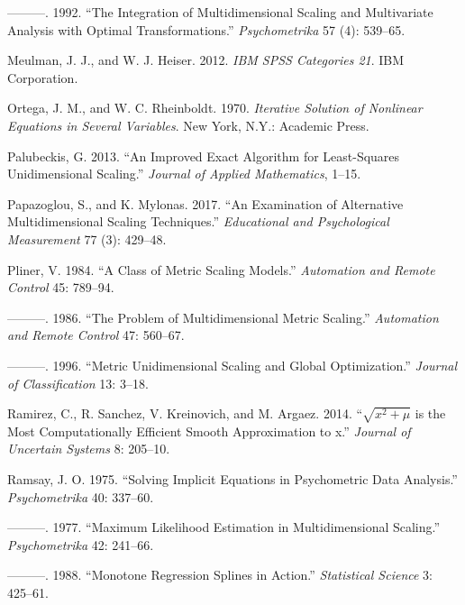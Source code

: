 \documentclass[
  12pt,
  letterpaper,
  DIV=11,
  numbers=noendperiod]{scrreprt}
\newlength{\cslhangindent}
\newenvironment{CSLReferences}[2] %
 {\begin{list}{}{%
  \setlength{\itemindent}{0pt}
  \setlength{\leftmargin}{0pt}
  \setlength{\parsep}{0pt}
  \ifodd #1
   \setlength{\leftmargin}{\cslhangindent}
   \setlength{\itemindent}{-1\cslhangindent}
  \fi
  \setlength{\itemsep}{#2\baselineskip}}}
 {\end{list}}
\theoremstyle{remark}
\begin{document}
\begin{CSLReferences}{1}{0}
---------. 1992. {``{The Integration of Multidimensional Scaling and
Multivariate Analysis with Optimal Transformations}.''}
\emph{Psychometrika} 57 (4): 539--65.

Meulman, J. J., and W. J. Heiser. 2012. \emph{IBM SPSS Categories 21}.
IBM Corporation.

Ortega, J. M., and W. C. Rheinboldt. 1970. \emph{{Iterative Solution of
Nonlinear Equations in Several Variables}}. New York, N.Y.: Academic
Press.

Palubeckis, G. 2013. {``{An Improved Exact Algorithm for Least-Squares
Unidimensional Scaling}.''} \emph{Journal of Applied Mathematics},
1--15.

Papazoglou, S., and K. Mylonas. 2017. {``{An Examination of Alternative
Multidimensional Scaling Techniques}.''} \emph{Educational and
Psychological Measurement} 77 (3): 429--48.

Pliner, V. 1984. {``{A Class of Metric Scaling Models}.''}
\emph{Automation and Remote Control} 45: 789--94.

---------. 1986. {``{The Problem of Multidimensional Metric Scaling}.''}
\emph{Automation and Remote Control} 47: 560--67.

---------. 1996. {``{Metric Unidimensional Scaling and Global
Optimization}.''} \emph{Journal of Classification} 13: 3--18.

Ramirez, C., R. Sanchez, V. Kreinovich, and M. Argaez. 2014.
{``{\(\sqrt{x^2+\mu}\) is the Most Computationally Efficient Smooth
Approximation to \vert{}x\vert{}}.''} \emph{Journal of Uncertain
Systems} 8: 205--10.

Ramsay, J. O. 1975. {``Solving Implicit Equations in Psychometric Data
Analysis.''} \emph{Psychometrika} 40: 337--60.

---------. 1977. {``{Maximum Likelihood Estimation in Multidimensional
Scaling}.''} \emph{Psychometrika} 42: 241--66.

---------. 1988. {``{Monotone Regression Splines in Action}.''}
\emph{Statistical Science} 3: 425--61.


\end{CSLReferences}
\end{document}
